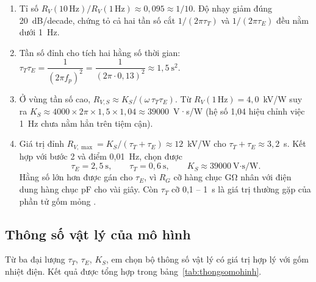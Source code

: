 \begin{enumerate}
  \item Tỉ số $R_V(10\,\text{Hz})/R_V(1\,\text{Hz}) \approx 0{,}095 \approx 1/10$. Độ nhạy giảm đúng 20~dB/decade, chứng tỏ cả hai tần số cắt $1/(2\pi\tau_T)$ và $1/(2\pi\tau_E)$ đều nằm dưới 1~Hz.
  \item Tần số đỉnh cho tích hai hằng số thời gian:
  $\tau_T\tau_E = \dfrac{1}{(2\pi f_p)^2} = \dfrac{1}{(2\pi\cdot 0{,}13)^2} \approx 1{,}5~\text{s}^2 .$
  \item Ở vùng tần số cao, $R_{V,S} \approx K_S/(\omega\,\tau_T\tau_E)$. Từ $R_V(1\,\text{Hz}) = 4{,}0$~kV/W suy ra
  $K_S \approx 4000 \times 2\pi \times 1{,}5 \times 1{,}04 \approx \num{39000}$~V·s/W (hệ số 1,04 hiệu chỉnh việc 1~Hz chưa nằm hẳn trên tiệm cận).
  \item Giá trị đỉnh $R_{V,\max} = K_S/(\tau_T+\tau_E) \approx 12$~kV/W cho $\tau_T + \tau_E \approx 3{,}2$~s. Kết hợp với bước 2 và điểm 0,01~Hz, chọn được
  \begin{equation*}
    \boxed{\tau_E = 2{,}5~\text{s},\qquad \tau_T = 0{,}6~\text{s},\qquad K_S \approx \num{39000}~\text{V·s/W}.}
  \end{equation*}
  Hằng số lớn hơn được gán cho $\tau_E$, vì $R_G$ cỡ hàng chục GΩ nhân với điện dung hàng chục pF cho vài giây. Còn $\tau_T$ cỡ 0,1 -- 1~s là giá trị thường gặp của phần tử gốm mỏng \cite{whatmore}.
\end{enumerate}

\subsection{Thông số vật lý của mô hình}

Từ ba đại lượng $\tau_T$, $\tau_E$, $K_S$, em chọn bộ thông số vật lý có giá trị hợp lý với gốm nhiệt điện. Kết quả được tổng hợp trong bảng~\ref{tab:thongsomohinh}.

